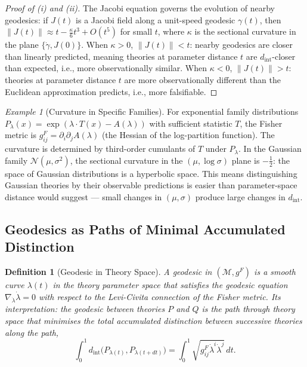 \documentclass[12pt,a4paper]{article}
\newtheorem{definition}[theorem]{Definition}
\theoremstyle{remark}
\newtheorem{example}{Example}[section]
\theoremstyle{definition}
\begin{document}
\begin{proof}[Proof of (i) and (ii)]
The Jacobi equation governs the evolution of nearby geodesics: if
$J(t)$ is a Jacobi field along a unit-speed geodesic $\gamma(t)$, then
$\|J(t)\| \approx t - \frac{\kappa}{6}t^3 + O(t^5)$ for small $t$, where
$\kappa$ is the sectional curvature in the plane $\{\dot\gamma, J(0)\}$.
When $\kappa > 0$, $\|J(t)\| < t$: nearby geodesics are closer than
linearly predicted, meaning theories at parameter distance $t$ are
$d_{\mathrm{int}}$-closer than expected, i.e., more observationally
similar. When $\kappa < 0$, $\|J(t)\| > t$: theories at parameter
distance $t$ are more observationally different than the Euclidean
approximation predicts, i.e., more falsifiable.
\end{proof}

\begin{example}[Curvature in Specific Families]
For exponential family distributions $P_\lambda(x) = \exp(\lambda \cdot
T(x) - A(\lambda))$ with sufficient statistic $T$, the Fisher metric is
$g^F_{ij} = \partial_i\partial_j A(\lambda)$ (the Hessian of the
log-partition function). The curvature is determined by third-order
cumulants of $T$ under $P_\lambda$. In the Gaussian family
$\mathcal{N}(\mu, \sigma^2)$, the sectional curvature in the
$(\mu, \log\sigma)$ plane is $-\frac{1}{2}$: the space of Gaussian
distributions is a hyperbolic space. This means distinguishing Gaussian
theories by their observable predictions is easier than parameter-space
distance would suggest --- small changes in $(\mu, \sigma)$ produce large
changes in $d_{\mathrm{int}}$.
\end{example}

\subsection{Geodesics as Paths of Minimal Accumulated Distinction}

\begin{definition}[Geodesic in Theory Space]
A \emph{geodesic} in $(\mathcal{M}, g^F)$ is a smooth curve
$\lambda(t)$ in the theory parameter space that satisfies the
geodesic equation $\nabla_{\dot\lambda}\dot\lambda = 0$ with respect to
the Levi-Civita connection of the Fisher metric. Its interpretation:
the geodesic between theories $P$ and $Q$ is the path through theory
space that minimises the total accumulated distinction between successive
theories along the path,
\begin{equation}
  \int_0^1 d_{\mathrm{int}}\!\bigl(P_{\lambda(t)},
  P_{\lambda(t+dt)}\bigr) = \int_0^1 \!\sqrt{g^F_{ij}\dot\lambda^i
  \dot\lambda^j}\, dt.
\end{equation}
\end{definition}
\end{document}
